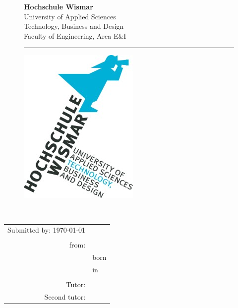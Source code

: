 \begin{titlepage}
	\setlength\headsep{-5mm}
	\begin{figure}[!h]
		\begin{minipage}{0.8\textwidth}
			\textbf{Hochschule Wismar} \\
			University of Applied Sciences \\
			Technology, Business and Design \\
			Faculty of Engineering, Area E\&{}I \\
		\rule{\textwidth}{0.5pt}
		\end{minipage}
		\begin{minipage}[r]{0.1\textwidth}
			\begin{flushright}
				\includegraphics[height=6\baselineskip]{pics/HSLogo.jpg}
			\end{flushright}
		\end{minipage}
	\end{figure}
	\vspace*{6cm}
	\begin{center}
		\Huge
		\textbf{\documentType} \\
		\vspace{2cm}
		\large \thetitle
		\begin{table}[b]
			\begin{tabular}{rl}
				Submitted by:  \today \\
				\\
				from: & \theauthor \\
				& born \birthday \\
				& in \birthplace \\
				\\
				Tutor: & \firstTutor \\
				Second tutor: & \secondTutor
			\end{tabular}
		\end{table}
	\end{center}
\end{titlepage}